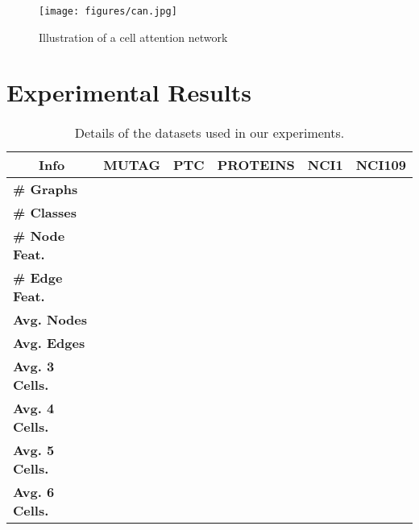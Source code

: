 \documentclass{article}
\begin{document}
\begin{figure}[t]
    \centering
    \texttt{[image: figures/can.jpg]}
    \caption{Illustration of a cell attention network}
    \label{fig:tan}
\end{figure}

\section{Experimental Results}\label{sec:exp_res}




\begin{table}[t]
\begin{center}
\caption{Details of the datasets used in our experiments.}
\label{tab:dataset_details}
\begin{tabular}{lccccc}
\toprule
\multicolumn{1}{c}{Info}  & \multicolumn{1}{c}{MUTAG} & \multicolumn{1}{c}{PTC} & \multicolumn{1}{c}{PROTEINS} & \multicolumn{1}{c}{NCI1} & \multicolumn{1}{c}{NCI109} \\  \bottomrule
\textbf{\# Graphs} & 
\multicolumn{1}{c}{} & 
\multicolumn{1}{c}{} & 
\multicolumn{1}{c}{} & 
\multicolumn{1}{c}{} & 
\multicolumn{1}{c}{} \\
\textbf{\# Classes}            & 
\multicolumn{1}{c}{} & 
\multicolumn{1}{c}{} & 
\multicolumn{1}{c}{}& 
\multicolumn{1}{c}{} & 
\multicolumn{1}{c}{} \\
\textbf{\# Node Feat.}            & 
\multicolumn{1}{c}{} & 
\multicolumn{1}{c}{} & 
\multicolumn{1}{c}{}& 
\multicolumn{1}{c}{} & 
\multicolumn{1}{c}{} \\
\textbf{\# Edge Feat.}            & 
\multicolumn{1}{c}{} & 
\multicolumn{1}{c}{} & 
\multicolumn{1}{c}{}& 
\multicolumn{1}{c}{} & 
\multicolumn{1}{c}{} \\
\textbf{Avg. Nodes}            & 
\multicolumn{1}{c}{} & 
\multicolumn{1}{c}{} & 
\multicolumn{1}{c}{}& 
\multicolumn{1}{c}{} & 
\multicolumn{1}{c}{} \\
\textbf{Avg. Edges}            & 
\multicolumn{1}{c}{} & 
\multicolumn{1}{c}{} & 
\multicolumn{1}{c}{}& 
\multicolumn{1}{c}{} & 
\multicolumn{1}{c}{} \\
\textbf{Avg. 3 Cells.}            & 
\multicolumn{1}{c}{} & 
\multicolumn{1}{c}{} & 
\multicolumn{1}{c}{}& 
\multicolumn{1}{c}{} & 
\multicolumn{1}{c}{} \\
\textbf{Avg. 4 Cells.}            & 
\multicolumn{1}{c}{} & 
\multicolumn{1}{c}{} & 
\multicolumn{1}{c}{}& 
\multicolumn{1}{c}{} & 
\multicolumn{1}{c}{} \\
\textbf{Avg. 5 Cells.}            & 
\multicolumn{1}{c}{} & 
\multicolumn{1}{c}{} & 
\multicolumn{1}{c}{}& 
\multicolumn{1}{c}{} & 
\multicolumn{1}{c}{} \\
\textbf{Avg. 6 Cells.}            & 
\multicolumn{1}{c}{} & 
\multicolumn{1}{c}{} & 
\multicolumn{1}{c}{}& 
\multicolumn{1}{c}{} & 
\multicolumn{1}{c}{} \\
\bottomrule
\end{tabular}
\end{center}
\end{table}
\end{document}
